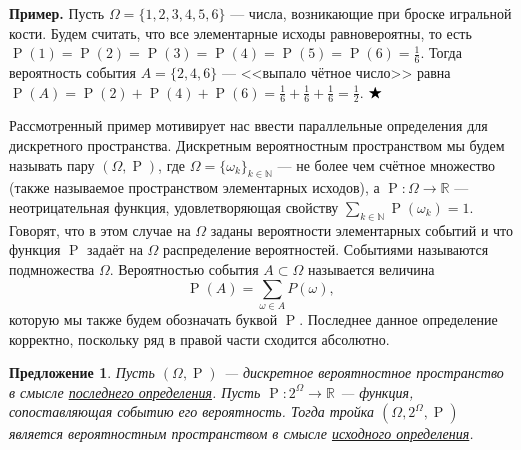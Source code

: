 \documentclass[12pt]{article}
\newtheorem{proposition}[theorem]{Предложение}
\numberwithin{theorem}{section}
\theoremstyle{definition}
\newenvironment{example}{\indent \textbf{Пример.}}{$ \hfill \bigstar $}
\newcommand{\defin}[2]{\hypertarget{#2}{{\color{red} #1}}}
\newcommand{\RR}{\mathbb{R}}
\newcommand{\prob}{\operatorname{P}}
\begin{document}
	\begin{example}
		Пусть $ \Omega = \{1,2,3,4,5,6\} $ --- числа, возникающие при броске игральной кости.
		Будем считать, что все элементарные исходы равновероятны, 
		то есть $ \prob(1) = \prob(2) = \prob(3) = \prob(4) = \prob(5) = \prob(6) = \tfrac{1}{6} $.
		Тогда вероятность события $ A = \{2,4,6\} $ --- <<выпало чётное число>> 
		равна $ \prob(A) = \prob(2) + \prob(4) + \prob(6) = \tfrac{1}{6} + \tfrac{1}{6} + \tfrac{1}{6} = \tfrac{1}{2} $.
	\end{example}
	
	Рассмотренный пример мотивирует нас ввести параллельные определения для дискретного пространства.
	\defin{Дискретным вероятностным пространством}{discr-2} мы будем называть  пару $ (\Omega, \prob) $, 
	где $ \Omega = \{\omega_k\}_{k \in \mathbb{N}} $ --- не более чем счётное множество 
	(также называемое \defin{пространством элементарных исходов}{space-discr}),
	а $ \prob \colon \Omega \to \RR $ --- неотрицательная функция, удовлетворяющая свойству
	$ \sum\limits_{k \in \mathbb{N}} \prob(\omega_k) = 1 $.	
	Говорят, что в этом случае на $ \Omega $ \defin{заданы вероятности элементарных событий}{prob-defined} и что функция $ \prob $ 
	\defin{задаёт на $ \Omega $ распределение вероятностей}{disrtib-discr}.
	\defin{Событиями}{event-discr} называются подмножества $ \Omega $. 
	\defin{Вероятностью события}{prob-discr} $ A \subset \Omega $ называется величина
	$$ \prob(A) = \sum\limits_{\omega \in A} P(\omega), $$
	которую мы также будем обозначать буквой $ \prob $. 
	Последнее данное определение корректно, поскольку ряд в правой части сходится абсолютно.
	
	\begin{proposition} \label{}
		Пусть $ (\Omega, \prob) $ --- дискретное вероятностное пространство в смысле \hyperlink{discr-2}{последнего определения}.
		Пусть $ \prob \colon 2^{\Omega} \to \mathbb{R} $ --- функция, сопоставляющая событию его вероятность.
		Тогда тройка $ (\Omega, 2^{\Omega}, \prob) $ является вероятностным пространством в смысле \hyperlink{prob-space}{исходного определения}.
	\end{proposition}
	
\end{document}
